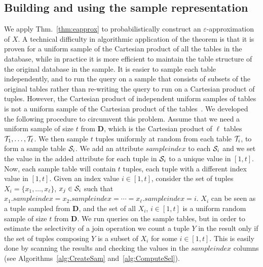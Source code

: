 \subsection{Building and using the sample representation}\label{sec:building}
We apply Thm.~\ref{thm:eapprox} to probabilistically construct an $\varepsilon$-approximation of $X$.
A technical difficulty in algorithmic application of the theorem is that it is proven  for
a uniform sample of the Cartesian product
of all the tables in the database, while
in practice it is more efficient to maintain the table structure of the
original database in the sample. It is easier to sample each table
independently, and to run the query on a sample that consists of subsets of the
original tables rather than re-writing the query to run on a Cartesian product
of tuples. However, the Cartesian product of independent uniform samples of
tables is not a uniform sample of the Cartesian product of the
tables~\citep{ChaudhuriMN99}. We developed the following procedure to circumvent
this problem. Assume that we need a uniform sample of size $t$ from
$\mathbf{D}$, which is the Cartesian product of $\ell$ tables
${\cal T}_1,\dotsc,{\cal T}_\ell$. We then sample $t$ tuples uniformly at random from
each table ${\cal T}_i$, to form a sample table ${\cal S}_i$. We add an attribute
$sampleindex$ to each ${\cal S}_i$ and we set the value in the added attribute for each tuple in
${\cal S}_i$ to a unique value in $[1,t]$. Now, each sample table will contain $t$ tuples,
each tuple with a different index value in $[1,t]$. Given an index value
$i\in[1,t]$, consider the set of tuples $X_i=\{x_1,\dotsc,x_\ell\}$, $x_j\in{\cal S}_i$
such that $x_1.sampleindex = x_2.sampleindex =\dotsb=x_\ell.sampleindex=i$. $X_i$
can be seen as a tuple sampled from $\mathbf{D}$, and the set of all $X_i$,
$i\in[1,t]$ is a uniform random sample of size $t$ from $\mathbf{D}$. We run
queries on the sample tables, but in order to estimate the selectivity of a join
operation we count a tuple $Y$ in the result only if the set of tuples composing
$Y$ is a subset of $X_i$ for some $i\in[1,t]$. This is easily done by scanning
the results and checking the values in the $sampleindex$ columns (see Algorithms~\ref{alg:CreateSam} and~\ref{alg:ComputeSel}).

\begin{algorithm}[ht]
\DontPrintSemicolon
{}
\caption{$\mathtt{CreateSample}(s,(T_1,\dots,T_k))$}\label{alg:CreateSam}
\end{algorithm}

